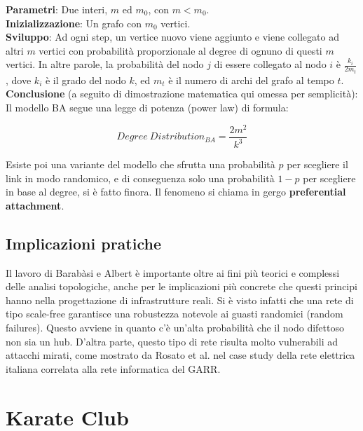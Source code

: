 \documentclass[12pt,twoside]{report}
\begin{document}
    \textbf{Parametri}: Due interi, $m$ ed $m_0$, con $m < m_0$.\\
    
    \textbf{Inizializzazione}: Un grafo con $m_0$ vertici.\\
    
    \textbf{Sviluppo}: Ad ogni step, un vertice nuovo viene aggiunto e viene collegato ad altri $m$ vertici con probabilità proporzionale al degree di ognuno di questi $m$ vertici. In altre parole, la probabilità del nodo $j$ di essere collegato al nodo $i$ è $\frac{k_i}{2m_t}$, dove $k_i$ è il grado del nodo $k$, ed $m_t$ è il numero di archi del grafo al tempo $t$.\\
    
    \textbf{Conclusione} (a seguito di dimostrazione matematica qui omessa per semplicità): Il modello BA segue una legge di potenza (power law) di formula:
    
    \begin{equation}
        Degree \ Distribution_{BA} = \frac{2m^2}{k^3}
    \end{equation}\vspace{0.5em}
    
    Esiste poi una variante del modello che sfrutta una probabilità $p$ per scegliere il link in modo randomico, e di conseguenza solo una probabilità $1-p$ per scegliere in base al degree, si è fatto finora. Il fenomeno si chiama in gergo \textbf{preferential attachment}.
    
    \subsection{Implicazioni pratiche}
    
    Il lavoro di Barabàsi e Albert è importante oltre ai fini più teorici e complessi delle analisi topologiche, anche per le implicazioni più concrete che questi principi hanno nella progettazione di infrastrutture reali.
    Si è visto infatti che una rete di tipo scale-free garantisce una robustezza notevole ai guasti randomici (random failures). Questo avviene in quanto c'è un'alta probabilità che il nodo difettoso non sia un hub. D'altra parte, questo tipo di rete risulta molto vulnerabili ad attacchi mirati, come mostrato da Rosato et al.\cite{Rosato} nel case study della rete elettrica italiana correlata alla rete informatica del GARR.
    
    \section{Karate Club}
    
\end{document}
